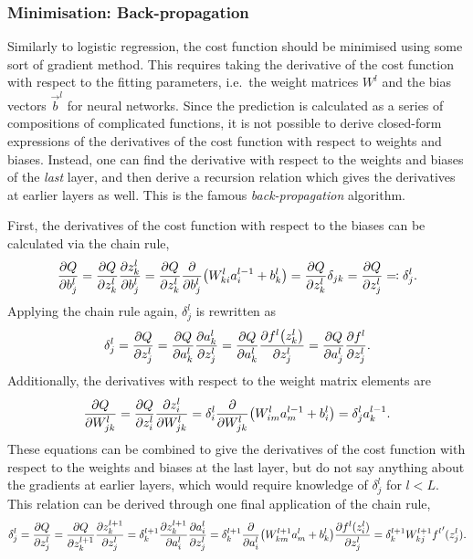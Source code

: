 \documentclass[11pt,british,a4paper]{article}
\numberwithin{equation}{section}
\begin{document}
\subsubsection{Minimisation: Back-propagation}
Similarly to logistic regression, the cost function should be minimised using some sort of gradient method.
This requires taking the derivative of the cost function with respect to the fitting parameters, i.e.\ the weight matrices \(W^l\) and the bias vectors \(\vec{b}^l\) for neural networks.
Since the prediction is calculated as a series of compositions of complicated functions, it is not possible to derive closed-form expressions of the derivatives of the cost function with respect to weights and biases.
Instead, one can find the derivative with respect to the weights and biases of the \emph{last} layer, and then derive a recursion relation which gives the derivatives at earlier layers as well. This is the famous \emph{back-propagation} algorithm.

First, the derivatives of the cost function with respect to the biases can be calculated via the chain rule,
\begin{equation}
    \pdv{Q}{b_j^l} = \pdv{Q}{z_k^l}\pdv{z_k^l}{b_j^l} = \pdv{Q}{z_k^l}\pdv{b_j^l}(W_{ki}^l a_i^{l-1} + b_k^l) = \pdv{Q}{z_k^l}\delta_{jk}
    = \pdv{Q}{z_j^l} \eqqcolon \delta_j^l.
\end{equation}
Applying the chain rule again, \(\delta_j^l\) is rewritten as
\begin{equation}
    \delta_j^l = \pdv{Q}{z_j^l} = \pdv{Q}{a_k^l}\pdv{a_k^l}{z_j^l} = \pdv{Q}{a_k^l}\pdv{f^l\qty(z_k^l)}{z_j^l}
               = \pdv{Q}{a_j^l}\pdv{f^l}{z_j^l}.
\end{equation}
Additionally, the derivatives with respect to the weight matrix elements are
\begin{equation}
    \pdv{Q}{W_{jk}^l} = \pdv{Q}{z_i^l}\pdv{z_i^l}{W_{jk}^l} = \delta_i^l \pdv{W_{jk}^l}\qty(W_{im}^l a_m^{l-1} + b_i^l)
                      = \delta_j^l a_k^{l-1}.
\end{equation}
These equations can be combined to give the derivatives of the cost function with respect to the weights and biases at the last layer, but do not say anything about the gradients at earlier layers, which would require knowledge of \(\delta_j^l\) for \(l<L\).
This relation can be derived through one final application of the chain rule,
\begin{equation}
    \delta_j^l = \pdv{Q}{z_j^l} = \pdv{Q}{z_k^{l+1}}\pdv{z_k^{l+1}}{z_j^l}
               = \delta_k^{l+1} \pdv{z_k^{l+1}}{a_i^l}\pdv{a_i^l}{z_j^{l}}
               = \delta_k^{l+1} \pdv{a_i^l}\qty(W_{km}^{l+1}a_m^l + b_k^l) \pdv{f^l(z_i^l)}{z_j^{l}}
               = \delta_k^{l+1} W_{kj}^{l+1} {f^l} '(z_j^l).
\end{equation}
\end{document}
